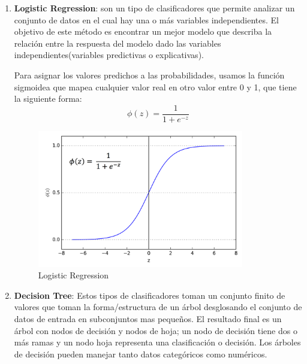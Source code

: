 \begin{enumerate}
\item \textbf{Logistic Regression}: son un tipo de clasificadores que permite analizar un conjunto de datos en el cual hay una o más variables independientes. El objetivo de este método es encontrar un mejor modelo que describa la relación entre la respuesta del modelo dado las variables independientes(variables predictivas o explicativas). 

Para asignar los valores predichos a las probabilidades, usamos la función sigmoidea que mapea cualquier valor real en otro valor entre 0 y 1, que tiene la siguiente forma:
\begin{equation}
\phi(z) = \frac{1}{1+e^{-z}}
\end{equation}

\begin{figure}[H]
 \centering
  \includegraphics[height=6cm,keepaspectratio=true,clip=true]{imagenes/MarcoTeorico/sigmoide.png}
  \caption{Logistic Regression}
  \label{Fig: log_reg}
\end{figure}


\item \textbf{Decision Tree}: Estos tipos de clasificadores toman un conjunto finito de valores  que toman la forma/estructura de un árbol desglosando el conjunto de datos de entrada en subconjuntos mas pequeños. El resultado final es un árbol con nodos de decisión y nodos de hoja; un nodo de decisión tiene dos o más ramas y un nodo hoja representa una clasificación o decisión. Los árboles de decisión pueden manejar tanto datos categóricos como numéricos.
  

\end{enumerate}
